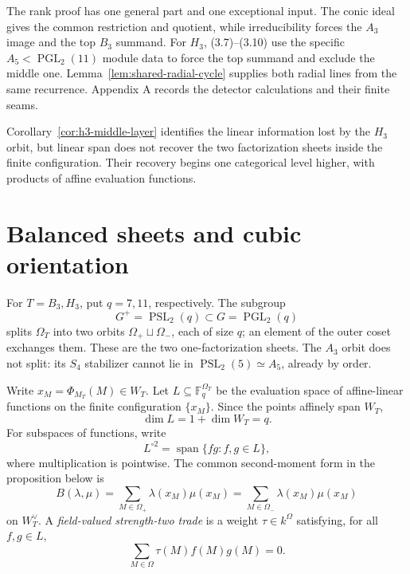\documentclass[11pt]{article}
\theoremstyle{definition}
\theoremstyle{remark}
\newcommand{\F}{\mathbb{F}}
\begin{document}
The rank proof has one general part and one exceptional input.  The conic
ideal gives the common restriction and quotient, while irreducibility
forces the \(A_3\) image and the top \(B_3\) summand.  For \(H_3\),
(3.7)--(3.10) use the specific
\(A_5<\operatorname{PGL}_2(11)\) module data to force the top summand and
exclude the middle one.  Lemma~\ref{lem:shared-radial-cycle} supplies both
radial lines from the same recurrence.  Appendix A records the detector
calculations and their finite seams.

Corollary~\ref{cor:h3-middle-layer} identifies the linear information
lost by the \(H_3\) orbit, but linear span does not recover the two
factorization sheets inside the finite configuration.  Their recovery
begins one categorical level higher, with products of affine evaluation
functions.

\section{Balanced sheets and cubic orientation}
\label{sec:balanced}

For \(T=B_3,H_3\), put \(q=7,11\), respectively.  The subgroup
\[
 G^+=\operatorname{PSL}_2(q)
 \subset G=\operatorname{PGL}_2(q)
\]
splits \(\Omega_T\) into two orbits
\(\Omega_+\sqcup\Omega_-\), each of size \(q\); an element of the outer
coset exchanges them.  These are the two one-factorization sheets.  The
\(A_3\) orbit does not split: its \(S_4\) stabilizer cannot lie in
\(\operatorname{PSL}_2(5)\simeq A_5\), already by order.

Write \(x_M=\Phi_{M_T}(M)\in W_T\).  Let \(L\subseteq\F_q^{\Omega_T}\)
be the evaluation space of affine-linear functions on the finite
configuration \(\{x_M\}\).  Since the points affinely span \(W_T\),
\[
 \dim L=1+\dim W_T=q.
\]
For subspaces of functions, write
\[
 L^{\circ2}=\operatorname{span}\{fg:f,g\in L\},
\]
where multiplication is pointwise.
The common second-moment form in the proposition below is
\[
 B(\lambda,\mu)=\sum_{M\in\Omega_+}\lambda(x_M)\mu(x_M)
               =\sum_{M\in\Omega_-}\lambda(x_M)\mu(x_M)
\]
on \(W_T^\vee\).  A \emph{field-valued strength-two trade} is a
weight \(\tau\in k^\Omega\) satisfying, for all \(f,g\in L\),
\[
 \sum_{M\in\Omega}\tau(M)f(M)g(M)=0.
\]
\end{document}
